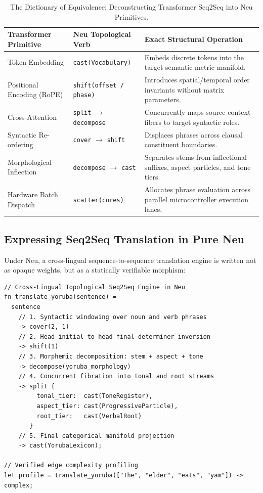 \documentclass[11pt]{article}
\begin{document}
\begin{table}[htbp]
\centering
\small
\begin{tabularx}{\linewidth}{llX}
\toprule
\textbf{Transformer Primitive} & \textbf{Neu Topological Verb} & \textbf{Exact Structural Operation} \\
\midrule
Token Embedding & \texttt{cast(Vocabulary)} & Embeds discrete tokens into the target semantic metric manifold. \\
Positional Encoding (RoPE) & \texttt{shift(offset / phase)} & Introduces spatial/temporal order invariants without matrix parameters. \\
Cross-Attention & \texttt{split} $\to$ \texttt{decompose} & Concurrently maps source context fibers to target syntactic roles. \\
Syntactic Re-ordering & \texttt{cover} $\to$ \texttt{shift} & Displaces phrases across clausal constituent boundaries. \\
Morphological Inflection & \texttt{decompose} $\to$ \texttt{cast} & Separates stems from inflectional suffixes, aspect particles, and tone tiers. \\
Hardware Batch Dispatch & \texttt{scatter(cores)} & Allocates phrase evaluation across parallel microcontroller execution lanes. \\
\bottomrule
\end{tabularx}
\caption{The Dictionary of Equivalence: Deconstructing Transformer Seq2Seq into Neu Primitives.}
\label{tab:seq2seq_dictionary}
\end{table}

\subsection{Expressing Seq2Seq Translation in Pure Neu}

Under Neu, a cross-lingual sequence-to-sequence translation engine is written not as opaque weights, but as a statically verifiable morphism:

\begin{lstlisting}[language=neu]
// Cross-Lingual Topological Seq2Seq Engine in Neu
fn translate_yoruba(sentence) =
  sentence
    // 1. Syntactic windowing over noun and verb phrases
    -> cover(2, 1)
    // 2. Head-initial to head-final determiner inversion
    -> shift(1)
    // 3. Morphemic decomposition: stem + aspect + tone
    -> decompose(yoruba_morphology)
    // 4. Concurrent fibration into tonal and root streams
    -> split {
         tonal_tier:  cast(ToneRegister),
         aspect_tier: cast(ProgressiveParticle),
         root_tier:   cast(VerbalRoot)
       }
    // 5. Final categorical manifold projection
    -> cast(YorubaLexicon);

// Verified edge complexity profiling
let profile = translate_yoruba(["The", "elder", "eats", "yam"]) -> complex;
\end{lstlisting}
\end{document}
